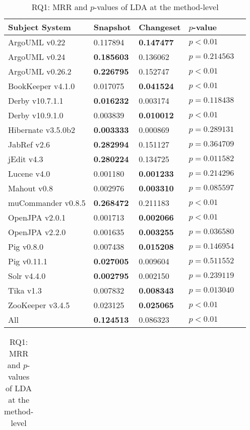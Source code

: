 \begin{table}[t]
\renewcommand{\arraystretch}{1.3}
\footnotesize
\centering
\caption{RQ1: MRR and $p$-values of LDA at the class-level}
\begin{tabular}{l|ll|ll}
\toprule
Subject System & Snapshot & Changeset & $p$-value  \\
\midrule
ArgoUML v0.22 & 0.117894 & {\bf 0.147477 } & $p < 0.01$ \\
ArgoUML v0.24 & {\bf 0.185603 } & 0.136062 & $p = 0.214563$ \\
ArgoUML v0.26.2 & {\bf 0.226795 } & 0.152747 & $p < 0.01$ \\
BookKeeper v4.1.0 & 0.017075 & {\bf 0.041524 } & $p < 0.01$ \\
Derby v10.7.1.1 & {\bf 0.016232 } & 0.003174 & $p = 0.118438$ \\
Derby v10.9.1.0 & 0.003839 & {\bf 0.010012 } & $p < 0.01$ \\
Hibernate v3.5.0b2 & {\bf 0.003333 } & 0.000869 & $p = 0.289131$ \\
JabRef v2.6 & {\bf 0.282994 } & 0.151127 & $p = 0.364709$ \\
jEdit v4.3 & {\bf 0.280224 } & 0.134725 & $p = 0.011582$ \\
Lucene v4.0 & 0.001180 & {\bf 0.001233 } & $p = 0.214296$ \\
Mahout v0.8 & 0.002976 & {\bf 0.003310 } & $p = 0.085597$ \\
muCommander v0.8.5 & {\bf 0.268472 } & 0.211183 & $p < 0.01$ \\
OpenJPA v2.0.1 & 0.001713 & {\bf 0.002066 } & $p < 0.01$ \\
OpenJPA v2.2.0 & 0.001635 & {\bf 0.003255 } & $p = 0.036580$ \\
Pig v0.8.0 & 0.007438 & {\bf 0.015208 } & $p = 0.146954$ \\
Pig v0.11.1 & {\bf 0.027005 } & 0.009604 & $p = 0.511552$ \\
Solr v4.4.0 & {\bf 0.002795 } & 0.002150 & $p = 0.239119$ \\
Tika v1.3 & 0.007832 & {\bf 0.008343 } & $p = 0.013040$ \\
ZooKeeper v3.4.5 & 0.023125 & {\bf 0.025065 } & $p < 0.01$ \\
\midrule
All & {\bf 0.124513 } & 0.086323 & $p < 0.01$ \\
\bottomrule
\end{tabular}
\label{table:rq1:class:lda}
\caption{RQ1: MRR and $p$-values of LDA at the method-level}
\begin{tabular}{l|ll|ll}

\end{tabular}
\end{table}
